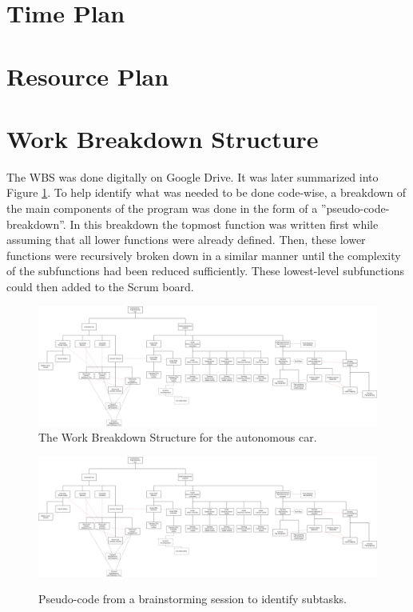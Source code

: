 \documentclass[11pt, titlepage]{article} %
\begin{document}
\clearpage



\clearpage
\appendix
\section{Time Plan}
\section{Resource Plan}

\section{Work Breakdown Structure}
The WBS was done digitally on Google Drive. It was later summarized into
Figure \ref{fig:wbs}. To help identify what was needed to be done
code-wise, a breakdown of the main components of the program was
done in the form of a ''pseudo-code-breakdown''. In this breakdown
the topmost function was written first while assuming that all lower
functions were already defined. Then, these lower functions were recursively
broken down in a similar manner until the complexity of the subfunctions
had been reduced sufficiently. These lowest-level subfunctions could then
added to the Scrum board.

\begin{figure}
    \centering
    \includegraphics[width=\textwidth]{wbs.png}
    \caption{The Work Breakdown Structure for the autonomous car.}
    \label{fig:wbs}
\end{figure}

\begin{figure}
    \centering
    \includegraphics[width=\textwidth]{wbs.png}
    \label{fig:code}
    \caption{Pseudo-code from a brainstorming session to identify subtasks.}
\end{figure}
\end{document}
